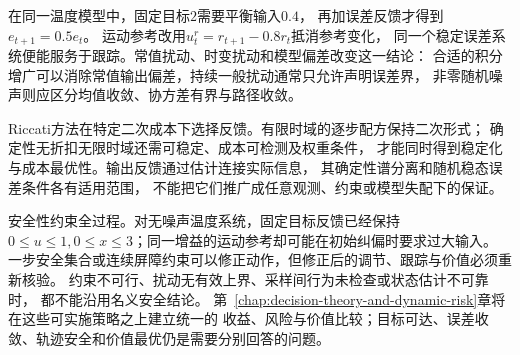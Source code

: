 在同一温度模型中，固定目标$2$需要平衡输入$0.4$，
再加误差反馈才得到$e_{t+1}=0.5e_t$。
运动参考改用$u_t^r=r_{t+1}-0.8r_t$抵消参考变化，
同一个稳定误差系统便能服务于跟踪。常值扰动、时变扰动和模型偏差改变这一结论：
合适的积分增广可以消除常值输出偏差，持续一般扰动通常只允许声明误差界，
非零随机噪声则应区分均值收敛、协方差有界与路径收敛。

Riccati方法在特定二次成本下选择反馈。有限时域的逐步配方保持二次形式；
确定性无折扣无限时域还需可稳定、成本可检测及权重条件，
才能同时得到稳定化与成本最优性。输出反馈通过估计连接实际信息，
其确定性谱分离和随机稳态误差条件各有适用范围，
不能把它们推广成任意观测、约束或模型失配下的保证。

安全性约束全过程。对无噪声温度系统，固定目标反馈已经保持
$0\leq u\leq1,0\leq x\leq3$；同一增益的运动参考却可能在初始纠偏时要求过大输入。
一步安全集合或连续屏障约束可以修正动作，但修正后的调节、跟踪与价值必须重新核验。
约束不可行、扰动无有效上界、采样间行为未检查或状态估计不可靠时，
都不能沿用名义安全结论。
第~\ref{chap:decision-theory-and-dynamic-risk}章将在这些可实施策略之上建立统一的
收益、风险与价值比较；目标可达、误差收敛、轨迹安全和价值最优仍是需要分别回答的问题。
